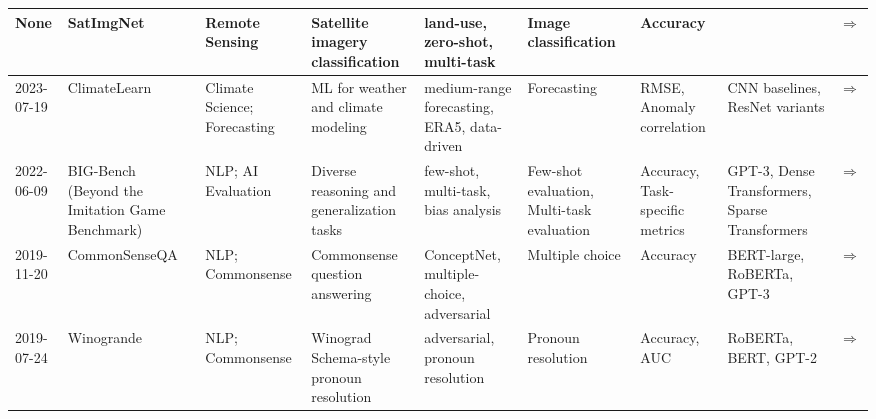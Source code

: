 \documentclass{article}
\begin{document}
\begin{landscape}
{\begin{longtable}{|p{1.5cm}|p{2.5cm}|p{2cm}|p{2cm}|p{2.5cm}|p{3cm}|p{2cm}|p{2cm}|p{1cm}|}
None & SatImgNet & Remote Sensing & Satellite imagery classification &  land-use, zero-shot, multi-task  &  Image classification  &  Accuracy  &    & \cite{roberts2023satinmultitaskmetadatasetclassifying} \href{https://arxiv.org/abs/2304.11619}{$\Rightarrow$ } \\ \hline
2023-07-19 & ClimateLearn & Climate Science; Forecasting & ML for weather and climate modeling &  medium-range forecasting, ERA5, data-driven  &  Forecasting  &  RMSE, Anomaly correlation  &  CNN baselines, ResNet variants  & \cite{nguyen2023climatelearnbenchmarkingmachinelearning} \href{https://arxiv.org/abs/2307.01909}{$\Rightarrow$ } \\ \hline
2022-06-09 & BIG-Bench (Beyond the Imitation Game Benchmark) & NLP; AI Evaluation & Diverse reasoning and generalization tasks &  few-shot, multi-task, bias analysis  &  Few-shot evaluation, Multi-task evaluation  &  Accuracy, Task-specific metrics  &  GPT-3, Dense Transformers, Sparse Transformers  & \cite{srivastava2023imitationgamequantifyingextrapolating} \href{https://arxiv.org/abs/2206.04615}{$\Rightarrow$ } \\ \hline
2019-11-20 & CommonSenseQA & NLP; Commonsense & Commonsense question answering &  ConceptNet, multiple-choice, adversarial  &  Multiple choice  &  Accuracy  &  BERT-large, RoBERTa, GPT-3  & \cite{talmor2019commonsenseqaquestionansweringchallenge} \href{https://arxiv.org/abs/1811.00937}{$\Rightarrow$ } \\ \hline
2019-07-24 & Winogrande & NLP; Commonsense & Winograd Schema-style pronoun resolution &  adversarial, pronoun resolution  &  Pronoun resolution  &  Accuracy, AUC  &  RoBERTa, BERT, GPT-2  & \cite{sakaguchi2019winograndeadversarialwinogradschema} \href{https://arxiv.org/abs/1907.10641}{$\Rightarrow$ } \\ \hline
\end{longtable}
}
\end{landscape}
\printbibliography
\end{document}
